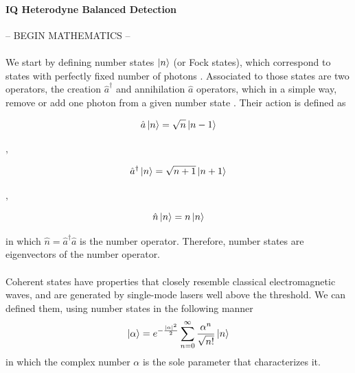 \begin{bibunit}[plain]
\paragraph{IQ Heterodyne Balanced Detection}




-- BEGIN MATHEMATICS --\\
\\
We start by defining number states $\ket{n}$ (or Fock states), which correspond to states with perfectly fixed number of photons
\cite{loudon2000}.
Associated to those states are two operators, the creation $\hat{a}^\dagger$ and annihilation $\hat{a}$ operators, which in a simple way, remove or add one photon from a given number state
\cite{fox2006}.
Their action is defined as
%
\begin{center}
	\hspace{-4mm}
	\begin{minipage}{44mm}
		\noindent
		\begin{equation}
			\hat{a} \ket{n} = \sqrt{n} \ket{n-1}
		\end{equation}
	\end{minipage}
	$,\quad$
	\begin{minipage}{52mm}
		\noindent
		\begin{equation}
			\hat{a}^\dagger \ket{n} = \sqrt{n+1} \ket{n+1}
		\end{equation}
	\end{minipage}
	$,\quad$
	\begin{minipage}{35mm}
		\noindent
		\begin{equation}
			\hat{n} \ket{n} = n \ket{n}
		\end{equation}
	\end{minipage}
\end{center}
%
in which $\hat{n} = \hat{a}^\dagger\hat{a}$ is the number operator. Therefore, number states are eigenvectors of the number operator.\\
\\
Coherent states have properties that closely resemble classical electromagnetic waves, and are generated by single-mode lasers well above the threshold.
\cite{loudon2000}
We can defined them, using number states in the following manner
\begin{equation}
\ket{\alpha} = e^{-\frac{|\alpha|^2}{2}} \sum_{n=0}^\infty \frac{\alpha^n}{\sqrt{n!}} \ket{n}
\end{equation}
in which the complex number $\alpha$ is the sole parameter that characterizes it.

\end{bibunit}
